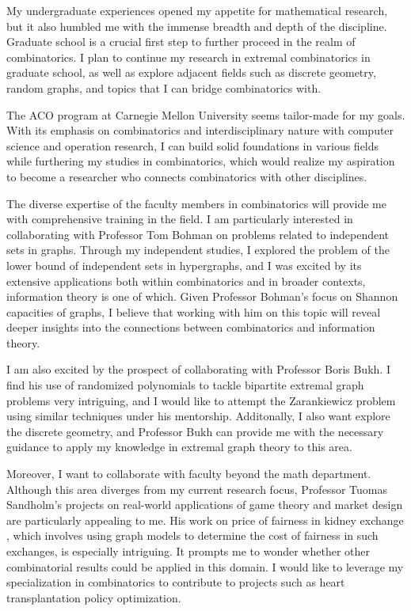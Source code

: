\documentclass[12pt]{article}
\begin{document}
My undergraduate experiences opened my appetite for mathematical research, but it also humbled me
with the immense breadth and depth of the discipline. Graduate school is a crucial first step to
further proceed in the realm of combinatorics. I plan to continue my research in extremal
combinatorics in graduate school, as well as explore adjacent fields such as discrete geometry,
random graphs, and topics that I can bridge combinatorics with.

The ACO program at Carnegie Mellon University seems tailor-made for my goals. With its emphasis on
combinatorics and interdisciplinary nature with computer science and operation research, I can build
solid foundations in various fields while furthering my studies in combinatorics, which would
realize my aspiration to become a researcher who connects combinatorics with other disciplines. 

The diverse expertise of the faculty members in combinatorics will provide me with comprehensive
training in the field. I am particularly interested in collaborating with Professor Tom Bohman on
problems related to independent sets in graphs. Through my independent studies, I explored the
problem of the lower bound of independent sets in hypergraphs, and I was excited by its extensive
applications both within combinatorics and in broader contexts, information theory is one of which.
Given Professor Bohman's focus on Shannon capacities of graphs, I believe that working with him on
this topic will reveal deeper insights into the connections between combinatorics and information
theory. 

I am also excited by the prospect of collaborating with Professor Boris Bukh. I find his use of
randomized polynomials to tackle bipartite extremal graph
problems\cite{bukh2017rationalexponentsextremalgraph} very intriguing, and I would like to attempt
the Zarankiewicz problem using similar techniques under his mentorship. Additonally, I also want
explore the discrete geometry, and Professor Bukh can provide me with the necessary guidance to
apply my knowledge in extremal graph theory to this area.

Moreover, I want to collaborate with faculty beyond the math department. Although this area diverges
from my current research focus, Professor Tuomas Sandholm's projects on real-world applications of
game theory and market design are particularly appealing to me. His work on price of fairness in
kidney exchange \cite{dickerson2014price}, which involves using graph models to determine the cost
of fairness in such exchanges, is especially intriguing. It prompts me to wonder whether other
combinatorial results could be applied in this domain. I would like to leverage my specialization in
combinatorics to contribute to projects such as heart transplantation policy optimization.
\end{document}
